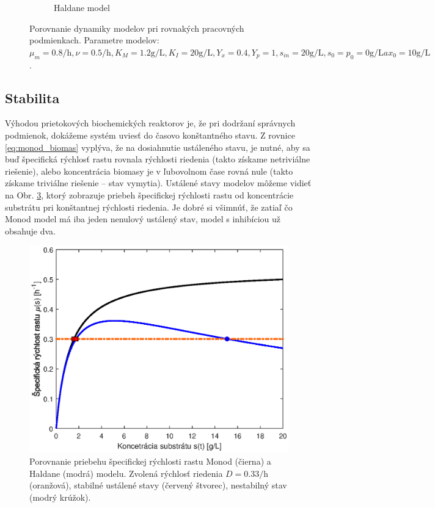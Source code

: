 \begin{figure}
\begin{subfigure}[b]{0.49\textwidth}
		\caption{Haldane model}
		\label{fig:dyn_comparison_haldane}
	\end{subfigure}
	\caption{Porovnanie dynamiky modelov pri rovnakých pracovných podmienkach. Parametre modelov: $ \mu_{m} = 0.8\si{\per\hour}, \nu = 0.5\si{\per\hour}, K_{M} = 1.2\si{\gram\per\liter}, K_{I} = 20\si{\gram\per\liter}, Y_{x} = 0.4, Y_{p} = 1, s_{in} = 20\si{\gram\per\liter}, s_0 = p_0 = 0\si{\gram\per\liter} a x_0 = 10\si{\gram\per\liter}$.}
	\label{fig:dyn_comparison}
\end{figure}

\subsection{Stabilita}
Výhodou prietokových biochemických reaktorov je, že pri dodržaní správnych podmienok, dokážeme systém uviesť do časovo konštantného stavu. Z rovnice \eqref{eq:monod_biomas} vyplýva, že na dosiahnutie ustáleného stavu, je nutné, aby sa buď špecifická rýchlosť rastu rovnala rýchlosti riedenia (takto získame netriviálne riešenie), alebo koncentrácia biomasy je v ľubovolnom čase rovná nule (takto získame triviálne riešenie -- stav vymytia). Ustálené stavy modelov môžeme vidieť na Obr. \ref{fig:spec_rychl_rastu}, ktorý zobrazuje priebeh špecifickej rýchlosti rastu od koncentrácie substrátu pri konštantnej rýchlosti riedenia. Je dobré si všimnúť, že zatiaľ čo Monod model má iba jeden nenulový ustálený stav, model s inhibíciou už obsahuje dva.
\begin{figure}
	\centering
	\includegraphics[width=0.7\linewidth]{images/spec_growth_rate}
	\caption{Porovnanie priebehu špecifickej rýchlosti rastu Monod (čierna) a Haldane (modrá) modelu. Zvolená rýchlosť riedenia $ D = 0.33\si{\per\hour} $ (oranžová), stabilné ustálené stavy (červený štvorec), nestabilný stav (modrý krúžok).}
	\label{fig:spec_rychl_rastu}
\end{figure}

